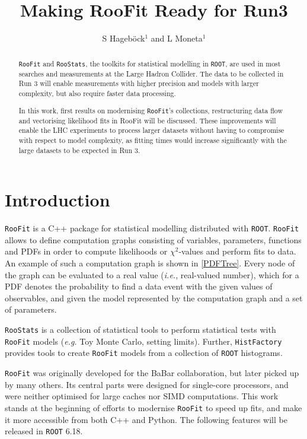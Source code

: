 \documentclass[a4paper]{jpconf}
\newcommand{\RooFit}{\texttt{RooFit}\xspace}
\newcommand{\RooStats}{\texttt{RooStats}\xspace}
\newcommand{\ROOT}{\texttt{ROOT}\xspace}
\begin{document}
\title{Making RooFit Ready for Run3}
\author{S Hageb\"ock$^1$ and L Moneta$^1$}
\address{$^1$ CERN, 1211 Geneva 23, Switzerland}

\begin{abstract}
\RooFit and \RooStats, the toolkits for statistical modelling in \ROOT, are used in most searches and measurements at the Large Hadron Collider. The data to be collected in Run 3 will enable measurements with higher precision and models with larger complexity, but also require faster data processing.

In this work, first results on modernising \RooFit's collections, restructuring data flow and vectorising likelihood fits in RooFit will be discussed. These improvements will enable the LHC experiments to process larger datasets without having to compromise with respect to model complexity, as fitting times would increase significantly with the large datasets to be expected in Run 3.
\end{abstract}

\section{Introduction}
\texttt{RooFit}\cite{RooFit} is a C++ package for statistical modelling distributed with \texttt{ROOT}\cite{ROOT}.
\RooFit allows to define computation graphs consisting of variables, parameters, functions and PDFs in order to compute likelihoods or 
$\chi^2$-values and perform fits to data. An example of such a computation graph is shown in \cref{PDFTree}. Every node of the graph can be
evaluated to a real value (\textit{i.e.}, real-valued number), which for a PDF denotes the probability to find a data event with the given
values of observables, and given the model represented by the computation graph and a set of parameters.

\texttt{RooStats} is a collection of statistical tools to perform statistical tests with \texttt{RooFit}
models (\textit{e.g.} Toy Monte Carlo, setting limits). Further, \texttt{HistFactory} provides tools to create \RooFit models from a collection of \ROOT histograms.

\RooFit was originally developed for the BaBar collaboration, but later picked up by many others. Its central parts were designed for
single-core processors, and were neither optimised for large caches nor SIMD computations. This work stands at the beginning of efforts to
modernise \RooFit to speed up fits, and make it more accessible from both C++ and Python. The following features will be released in \ROOT 6.18.
\end{document}
